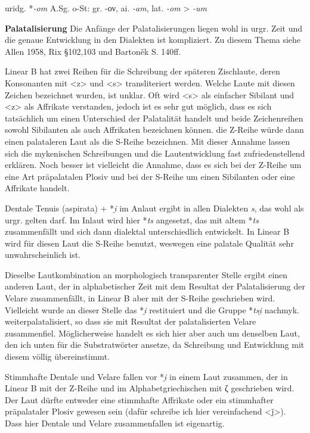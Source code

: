 \documentclass[12pt,a4paper,normalheadings]{scrartcl}
\newcounter{para}
\newcommand{\mypara}[1]{\vspace{1em}\par\noindent\refstepcounter{para}%
\textbf{\textsf{\thepara}}\enspace\textbf{#1}\quad}
\def\rek#1{*\textit{#1}}
\def\bel#1{\textit{#1}}
\begin{document}
\lex{\rek{m}}{\rek{n}}{\_\#}

uridg. \rek{-om} A.Sg. o-St: gr. -ον, ai. \bel{-am}, lat. \bel{-om} > \bel{-um}


\mypara{Palatalisierung}
\label{pal}
Die Anfänge der Palatalisierungen liegen wohl in urgr. Zeit
und die genaue Entwicklung in den Dialekten ist kompliziert.
Zu diesem Thema siehe Allen 1958, Rix §102,103 und Bartoněk S. 140ff.

Linear B hat zwei Reihen für die Schreibung der späteren Zischlaute,
deren Konsonanten mit <z> und <s> transliteriert werden.
Welche Laute mit diesen Zeichen bezeichnet wurden, ist unklar.
Oft wird <s> als einfacher Sibilant und <z> als Affrikate verstanden,
jedoch ist es sehr gut möglich,
dass es sich tatsächlich um einen Unterschied der Palatalität handelt
und beide Zeichenreihen sowohl Sibilanten als auch Affrikaten bezeichnen können.
die Z-Reihe würde dann einen palataleren Laut als die S-Reihe bezeichnen.
Mit dieser Annahme lassen sich die mykenischen Schreibungen
und die Lautentwicklung fast zufriedenstellend erklären.
Noch besser ist vielleicht die Annahme,
dass es sich bei der Z-Reihe um eine Art präpalatalen Plosiv
und bei der S-Reihe um einen Sibilanten oder eine Affrikate handelt.

Dentale Tenuis (aspirata) + \rek{i̯} im Anlaut ergibt in allen Dialekten \bel{s},
das wohl als urgr. gelten darf.
Im Inlaut wird hier \rek{ts} angesetzt, das mit altem \rek{ts} zusammenfällt
und sich dann dialektal unterschiedlich entwickelt.
In Linear B wird für diesen Laut die S-Reihe benutzt,
weswegen eine palatale Qualität sehr unwahrscheinlich ist.

\lex{\rek{(t, tʰ)i̯}}{\rek{s}}{\#\_}

\lex{\rek{(t, tʰ)i̯}}{\rek{ts}}{\_}

Dieselbe Lautkombination an morphologisch transparenter Stelle
ergibt einen anderen Laut,
der in alphabetischer Zeit mit dem Resultat der Palatalisierung der
Velare zusammenfällt,
in Linear B aber mit der S-Reihe geschrieben wird.
Vielleicht wurde an dieser Stelle das \rek{i̯} restituiert
und die Gruppe \rek{tsi̯} nachmyk. weiterpalatalisiert,
so dass sie mit Resultat der palatalisierten Velare zusammenfiel.
Möglicherweise handelt es sich hier aber auch um denselben Laut,
den ich unten für die Substratwörter ansetze,
da Schreibung und Entwicklung mit diesem völlig übereinstimmt.

Stimmhafte Dentale und Velare fallen vor \rek{i̯} in einem Laut zusammen,
der in Linear B mit der Z-Reihe und im Alphabetgriechischen mit ζ
geschrieben wird.
Der Laut dürfte entweder eine stimmhafte Affrikate oder ein
stimmhafter präpalataler Plosiv gewesen sein
(dafür schreibe ich hier vereinfachend <ǰ>).
Dass hier Dentale und Velare zusammenfallen ist eigenartig.
\end{document}
